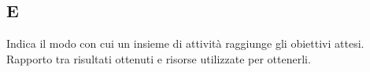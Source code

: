 \begin{center}
\section*{E}
\end{center}
Indica il modo con cui un insieme di attività raggiunge gli obiettivi attesi.
Rapporto tra risultati ottenuti e risorse utilizzate per ottenerli.
